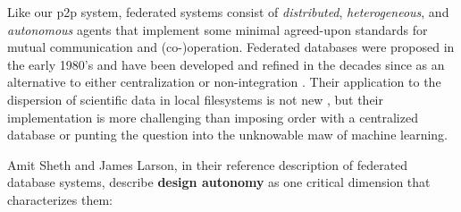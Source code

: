 Like our p2p system, federated systems consist of \emph{distributed},
\emph{heterogeneous}, and \emph{autonomous} agents that implement some
minimal agreed-upon standards for mutual communication and
(co-)operation. Federated databases were proposed in the early 1980's
\citep{heimbignerFederatedArchitectureInformation1985}  and have
been developed and refined in the decades since as an alternative to
either centralization or non-integration \citep{litwinInteroperabilityMultipleAutonomous1990, kashyapSemanticSchematicSimilarities1996, hullManagingSemanticHeterogeneity1997} . Their application to the
dispersion of scientific data in local filesystems is not new \citep{busseFederatedInformationSystems1999, djokic-petrovicPIBASFedSPARQLWebbased2017, hasnainBioFedFederatedQuery2017} , but their implementation is more
challenging than imposing order with a centralized database or punting
the question into the unknowable maw of machine learning.

Amit Sheth and James Larson, in their reference description of federated
database systems, describe \textbf{design autonomy} as one critical
dimension that characterizes them:

